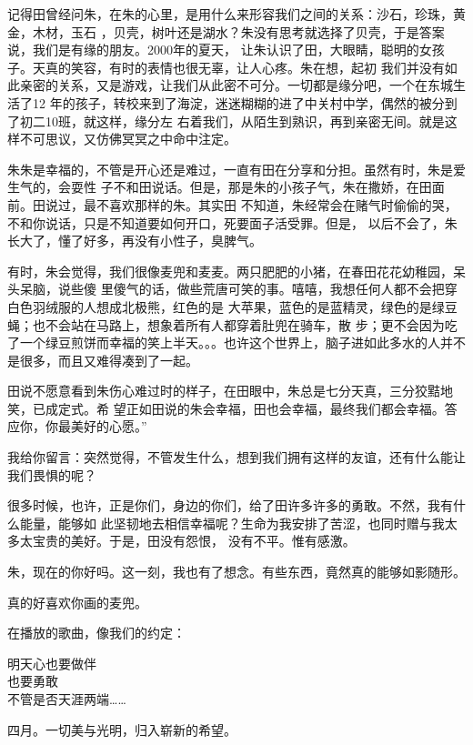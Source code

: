 \documentclass[12pt,a4paper]{article}
\begin{document}
		记得田曾经问朱，在朱的心里，是用什么来形容我们之间的关系：沙石，珍珠，黄金，木材，玉石
	，贝壳，树叶还是湖水？朱没有思考就选择了贝壳，于是答案说，我们是有缘的朋友。2000年的夏天，
	让朱认识了田，大眼睛，聪明的女孩子。天真的笑容，有时的表情也很无辜，让人心疼。朱在想，起初
	我们并没有如此亲密的关系，又是游戏，让我们从此密不可分。一切都是缘分吧，一个在东城生活了12
	年的孩子，转校来到了海淀，迷迷糊糊的进了中关村中学，偶然的被分到了初二10班，就这样，缘分左
	右着我们，从陌生到熟识，再到亲密无间。就是这样不可思议，又仿佛冥冥之中命中注定。

		朱朱是幸福的，不管是开心还是难过，一直有田在分享和分担。虽然有时，朱是爱生气的，会耍性
	子不和田说话。但是，那是朱的小孩子气，朱在撒娇，在田面前。田说过，最不喜欢那样的朱。其实田
	不知道，朱经常会在赌气时偷偷的哭，不和你说话，只是不知道要如何开口，死要面子活受罪。但是，
	以后不会了，朱长大了，懂了好多，再没有小性子，臭脾气。

		有时，朱会觉得，我们很像麦兜和麦麦。两只肥肥的小猪，在春田花花幼稚园，呆头呆脑，说些傻
	里傻气的话，做些荒唐可笑的事。嘻嘻，我想任何人都不会把穿白色羽绒服的人想成北极熊，红色的是
	大苹果，蓝色的是蓝精灵，绿色的是绿豆蝇；也不会站在马路上，想象着所有人都穿着肚兜在骑车，散
	步；更不会因为吃了一个绿豆煎饼而幸福的笑上半天。。。也许这个世界上，脑子进如此多水的人并不
	是很多，而且又难得凑到了一起。

		田说不愿意看到朱伤心难过时的样子，在田眼中，朱总是七分天真，三分狡黠地笑，已成定式。希
	望正如田说的朱会幸福，田也会幸福，最终我们都会幸福。答应你，你最美好的心愿。”

		我给你留言：突然觉得，不管发生什么，想到我们拥有这样的友谊，还有什么能让我们畏惧的呢？

		很多时候，也许，正是你们，身边的你们，给了田许多许多的勇敢。不然，我有什么能量，能够如
	此坚韧地去相信幸福呢？生命为我安排了苦涩，也同时赠与我太多太宝贵的美好。于是，田没有怨恨，
	没有不平。惟有感激。

		朱，现在的你好吗。这一刻，我也有了想念。有些东西，竟然真的能够如影随形。

		真的好喜欢你画的麦兜。

		在播放的歌曲，像我们的约定：

		\longpoem{}{}{}
		明天心也要做伴 \\
		也要勇敢 \\
		不管是否天涯两端……
		\endlongpoem

	\endwriting



		四月。一切美与光明，归入崭新的希望。
\end{document}
